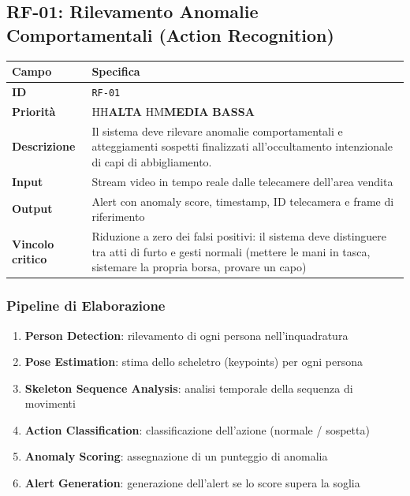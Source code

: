 \documentclass[a4paper, 12pt]{article}
\newcommand{\reqid}[1]{\texttt{\textcolor{visaiblue}{#1}}}
\newcommand{\priority}[1]{%
    \ifx#1H\textcolor{visaired}{\textbf{ALTA}}%
    \else\ifx#1M\textcolor{visaiorange}{\textbf{MEDIA}}%
    \else\textcolor{visaigreen}{\textbf{BASSA}}%
    \fi\fi
}
\begin{document}
\subsection{RF-01: Rilevamento Anomalie Comportamentali (Action Recognition)}

\begin{tabularx}{\textwidth}{lL}
    \toprule
    \textbf{Campo} & \textbf{Specifica} \\
    \midrule
    \textbf{ID} & \reqid{RF-01} \\
    \textbf{Priorità} & \priority{H} \\
    \textbf{Descrizione} & Il sistema deve rilevare anomalie comportamentali e atteggiamenti sospetti finalizzati all'occultamento intenzionale di capi di abbigliamento. \\
    \textbf{Input} & Stream video in tempo reale dalle telecamere dell'area vendita \\
    \textbf{Output} & Alert con anomaly score, timestamp, ID telecamera e frame di riferimento \\
    \textbf{Vincolo critico} & Riduzione a zero dei falsi positivi: il sistema deve distinguere tra atti di furto e gesti normali (mettere le mani in tasca, sistemare la propria borsa, provare un capo) \\
    \bottomrule
\end{tabularx}

\subsubsection{Pipeline di Elaborazione}

\begin{enumerate}
    \item \textbf{Person Detection}: rilevamento di ogni persona nell'inquadratura
    \item \textbf{Pose Estimation}: stima dello scheletro (keypoints) per ogni persona
    \item \textbf{Skeleton Sequence Analysis}: analisi temporale della sequenza di movimenti
    \item \textbf{Action Classification}: classificazione dell'azione (normale / sospetta)
    \item \textbf{Anomaly Scoring}: assegnazione di un punteggio di anomalia
    \item \textbf{Alert Generation}: generazione dell'alert se lo score supera la soglia
\end{enumerate}
\end{document}
